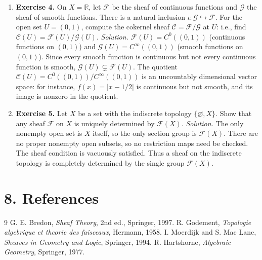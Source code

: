 \begin{enumerate}[leftmargin=*,itemsep=0.9em]
\item \textbf{Exercise 4.} On $X=\mathbb{R}$, let $\mathcal{F}$ be the sheaf of continuous functions and $\mathcal{G}$ the sheaf of smooth functions. There is a natural inclusion $\iota\colon\mathcal{G}\hookrightarrow\mathcal{F}$. For the open set $U=(0,1)$, compute the cokernel sheaf $\mathcal{C}=\mathcal{F}/\mathcal{G}$ at $U$: i.e., find $\mathcal{C}(U)=\mathcal{F}(U)/\mathcal{G}(U)$. \emph{Solution.} $\mathcal{F}(U)=C^0((0,1))$ (continuous functions on $(0,1)$) and $\mathcal{G}(U)=C^\infty((0,1))$ (smooth functions on $(0,1)$). Since every smooth function is continuous but not every continuous function is smooth, $\mathcal{G}(U)\subsetneq\mathcal{F}(U)$. The quotient $\mathcal{C}(U)=C^0((0,1))/C^\infty((0,1))$ is an uncountably dimensional vector space: for instance, $f(x)=|x-1/2|$ is continuous but not smooth, and its image is nonzero in the quotient.

\item \textbf{Exercise 5.} Let $X$ be a set with the indiscrete topology $\{\varnothing,X\}$. Show that any sheaf $\mathcal{F}$ on $X$ is uniquely determined by $\mathcal{F}(X)$. \emph{Solution.} The only nonempty open set is $X$ itself, so the only section group is $\mathcal{F}(X)$. There are no proper nonempty open subsets, so no restriction maps need be checked. The sheaf condition is vacuously satisfied. Thus a sheaf on the indiscrete topology is completely determined by the single group $\mathcal{F}(X)$.

\end{enumerate}
\section*{8. References}
\begin{thebibliography}{9}
 G. E. Bredon, \emph{Sheaf Theory}, 2nd ed., Springer, 1997.
 R. Godement, \emph{Topologie algebrique et theorie des faisceaux}, Hermann, 1958.
 I. Moerdijk and S. Mac Lane, \emph{Sheaves in Geometry and Logic}, Springer, 1994.
 R. Hartshorne, \emph{Algebraic Geometry}, Springer, 1977.
\end{thebibliography}
